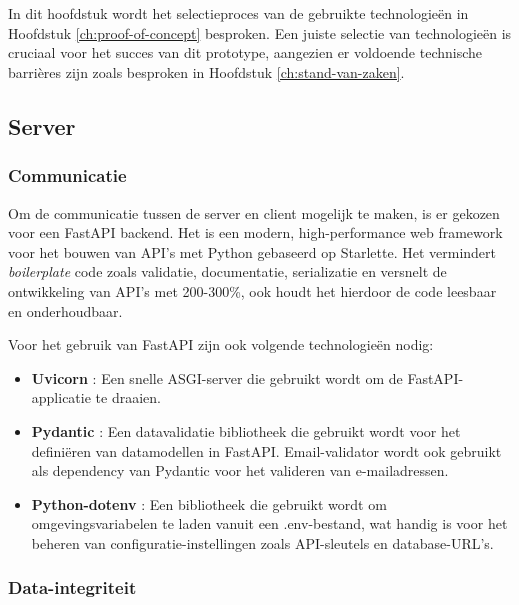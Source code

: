 \chapter{}%
\label{ch:shortlist}

In dit hoofdstuk wordt het selectieproces van de gebruikte technologieën in Hoofdstuk \ref{ch:proof-of-concept} besproken.
Een juiste selectie van technologieën is cruciaal voor het succes van dit prototype, 
aangezien er voldoende technische barrières zijn zoals besproken in Hoofdstuk \ref{ch:stand-van-zaken}.

\section{Server}

\subsection{Communicatie}

Om de communicatie tussen de server en client mogelijk te maken, is er gekozen voor een FastAPI \autocite{FastAPI} backend. Het is een modern, high-performance web framework voor het bouwen van \gls{API}'s met Python gebaseerd op Starlette.
Het vermindert \textit{boilerplate} code zoals validatie, documentatie, serializatie en versnelt de ontwikkeling van \gls{API}'s met 200-300\%, ook houdt het hierdoor de code leesbaar en onderhoudbaar.

Voor het gebruik van FastAPI zijn ook volgende technologieën nodig:
\begin{itemize}
    \item \textbf{Uvicorn} \autocite{Uvicorn}: Een snelle ASGI-server die gebruikt wordt om de FastAPI-applicatie te draaien.
    \item \textbf{Pydantic} \autocite{Pydantic}: Een datavalidatie bibliotheek die gebruikt wordt voor het definiëren van datamodellen in FastAPI. Email-validator wordt ook gebruikt als dependency van Pydantic voor het valideren van e-mailadressen.
    \item \textbf{Python-dotenv} \autocite{PythonDotenv}: Een bibliotheek die gebruikt wordt om omgevingsvariabelen te laden vanuit een .env-bestand, wat handig is voor het beheren van configuratie-instellingen zoals API-sleutels en database-URL's.
\end{itemize}

\subsection{Data-integriteit}

